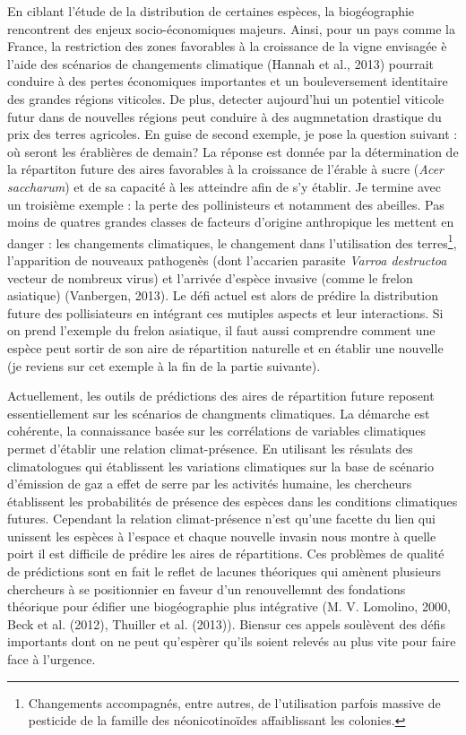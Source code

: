 En ciblant l'étude de la distribution de certaines espèces, la
biogéographie rencontrent des enjeux socio-économiques majeurs. Ainsi,
pour un pays comme la France, la restriction des zones favorables à la
croissance de la vigne envisagée è l'aide des scénarios de changements
climatique (Hannah et al., 2013) pourrait conduire à des pertes
économiques importantes et un bouleversement identitaire des grandes
régions viticoles. De plus, detecter aujourd'hui un potentiel viticole
futur dans de nouvelles régions peut conduire à des augmnetation
drastique du prix des terres agricoles. En guise de second exemple, je
pose la question suivant : où seront les érablières de demain? La
réponse est donnée par la détermination de la répartiton future des
aires favorables à la croissance de l'érable à sucre (\emph{Acer
saccharum}) et de sa capacité à les atteindre afin de s'y établir. Je
termine avec un troisième exemple : la perte des pollinisteurs et
notamment des abeilles. Pas moins de quatres grandes classes de facteurs
d'origine anthropique les mettent en danger : les changements
climatiques, le changement dans l'utilisation des terres\footnote{Changements
  accompagnés, entre autres, de l'utilisation parfois massive de
  pesticide de la famille des néonicotinoïdes affaiblissant les
  colonies.}, l'apparition de nouveaux pathogenès (dont l'accarien
parasite \emph{Varroa destructoa} vecteur de nombreux virus) et
l'arrivée d'espèce invasive (comme le frelon asiatique) (Vanbergen,
2013). Le défi actuel est alors de prédire la distribution future des
pollisiateurs en intégrant ces mutiples aspects et leur interactions. Si
on prend l'exemple du frelon asiatique, il faut aussi comprendre comment
une espèce peut sortir de son aire de répartition naturelle et en
établir une nouvelle (je reviens sur cet exemple à la fin de la partie
suivante).

Actuellement, les outils de prédictions des aires de répartition future
reposent essentiellement sur les scénarios de changments climatiques. La
démarche est cohérente, la connaissance basée sur les corrélations de
variables climatiques permet d'établir une relation climat-présence. En
utilisant les résulats des climatologues qui établissent les variations
climatiques sur la base de scénario d'émission de gaz a effet de serre
par les activités humaine, les chercheurs établissent les probabilités
de présence des espèces dans les conditions climatiques futures.
Cependant la relation climat-présence n'est qu'une facette du lien qui
unissent les espèces à l'espace et chaque nouvelle invasin nous montre à
quelle poirt il est difficile de prédire les aires de répartitions. Ces
problèmes de qualité de prédictions sont en fait le reflet de lacunes
théoriques qui amènent plusieurs chercheurs à se positionnier en faveur
d'un renouvellemnt des fondations théorique pour édifier une
biogéographie plus intégrative (M. V. Lomolino, 2000, Beck et al.
(2012), Thuiller et al. (2013)). Biensur ces appels soulèvent des défis
importants dont on ne peut qu'espèrer qu'ils soient relevés au plus vite
pour faire face à l'urgence.

